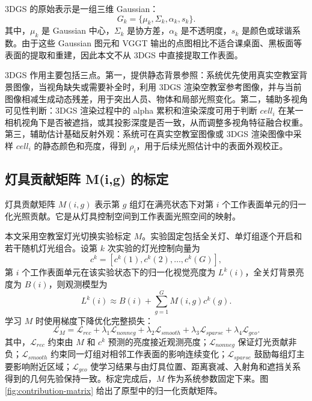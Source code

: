 \documentclass[UTF8,a4paper,zihao=-4]{ctexart}
\begin{document}
3DGS 的原始表示是一组三维 Gaussian：
\begin{equation}
G_k=\{\mu_k,\Sigma_k,\alpha_k,s_k\}.
\end{equation}
其中，$\mu_k$ 是 Gaussian 中心，$\Sigma_k$ 是协方差，$\alpha_k$ 是不透明度，$s_k$ 是颜色或球谐系数。由于这些 Gaussian 图元和 VGGT 输出的点图相比不适合课桌面、黑板面等表面的提取和重建，因此本文不从 3DGS 中直接提取工作表面。

3DGS 作用主要包括三点。第一，提供静态背景参照：系统优先使用真实空教室背景图像，当视角缺失或需要补全时，利用 3DGS 渲染空教室参考图像，并与当前图像相减生成动态残差，用于突出人员、物体和局部光照变化。第二，辅助多视角可见性判断：3DGS 渲染过程中的 alpha 累积和渲染深度可用于判断 $cell_i$ 在某一相机视角下是否被遮挡，或其投影深度是否一致，从而调整多视角特征融合权重。第三，辅助估计基础反射外观：系统可在真实空教室图像或 3DGS 渲染图像中采样 $cell_i$ 的静态颜色和亮度，得到 $\rho_i$，用于后续光照估计中的表面外观校正。

\subsection{灯具贡献矩阵 M(i,g) 的标定}

灯具贡献矩阵 $M(i,g)$ 表示第 $g$ 组灯在满亮状态下对第 $i$ 个工作表面单元的归一化光照贡献。它是从灯具控制空间到工作表面光照空间的映射。

本文采用空教室灯光切换实验标定 $M$。实验固定包括全关灯、单灯组逐个开启和若干随机灯光组合。设第 $k$ 次实验的灯光控制向量为
\begin{equation}
c^k=\left[c^k(1),c^k(2),\ldots,c^k(G)\right],
\end{equation}
第 $i$ 个工作表面单元在该实验状态下的归一化视觉亮度为 $L^k(i)$，全关灯背景亮度为 $B(i)$，则观测模型为
\begin{equation}
L^k(i)\approx B(i)+\sum_{g=1}^{G}M(i,g)c^k(g).
\end{equation}
学习 $M$ 时使用梯度下降优化完整损失：
\begin{equation}
\mathcal{L}_M=\mathcal{L}_{rec}+\lambda_1\mathcal{L}_{nonneg}+\lambda_2\mathcal{L}_{smooth}+\lambda_3\mathcal{L}_{sparse}+\lambda_4\mathcal{L}_{geo}.
\end{equation}
其中，$\mathcal{L}_{rec}$ 约束由 $M$ 和 $c^k$ 预测的亮度接近观测亮度；$\mathcal{L}_{nonneg}$ 保证灯光贡献非负；$\mathcal{L}_{smooth}$ 约束同一灯组对相邻工作表面的影响连续变化；$\mathcal{L}_{sparse}$ 鼓励每组灯主要影响附近区域；$\mathcal{L}_{geo}$ 使学习结果与由灯具位置、距离衰减、入射角和遮挡关系得到的几何先验保持一致。标定完成后，$M$ 作为系统参数固定下来。图 \ref{fig:contribution-matrix} 给出了原型中的归一化贡献矩阵。
\end{document}
